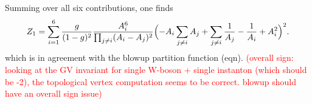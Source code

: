 Summing over all six contributions, one finds
\begin{align}
  Z_1 = \sum_{i=1}^6 \frac{g}{(1-g)^2} \frac{A_i^6}{\prod_{j \neq i} (A_i - A_j)^2} 
  \Bigl(-A_i \sum_{j\neq i} A_j +  \sum_{j\neq i}\frac{1}{A_j}  - \frac{1}{A_i} + A_i^2
 \Bigr)^2. 
\end{align}
which is in agreement with the blowup partition function (eqn). \textcolor{red}{(overall sign: looking at the GV invariant for single W-boson + single instanton (which should be -2), the topological vertex computation seems to be correct. blowup should have an overall sign issue)}